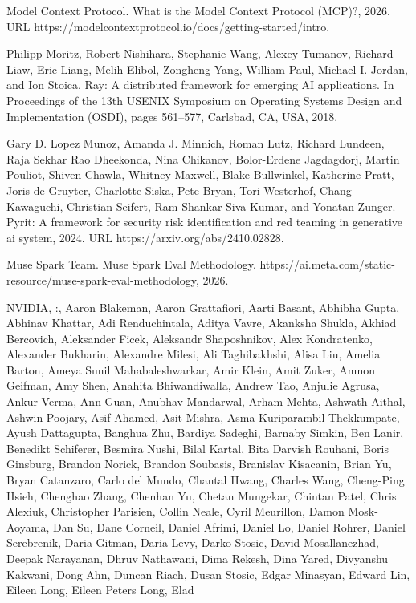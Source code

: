\documentclass[
  10
]{article}
\begin{document}
Model Context Protocol. What is the Model Context Protocol (MCP)?, 2026.
URL https://modelcontextprotocol.io/docs/getting-started/intro.

Philipp Moritz, Robert Nishihara, Stephanie Wang, Alexey Tumanov,
Richard Liaw, Eric Liang, Melih Elibol, Zongheng Yang, William Paul,
Michael I. Jordan, and Ion Stoica. Ray: A distributed framework for
emerging AI applications. In Proceedings of the 13th USENIX Symposium on
Operating Systems Design and Implementation (OSDI), pages 561--577,
Carlsbad, CA, USA, 2018.

Gary D. Lopez Munoz, Amanda J. Minnich, Roman Lutz, Richard Lundeen,
Raja Sekhar Rao Dheekonda, Nina Chikanov, Bolor-Erdene Jagdagdorj,
Martin Pouliot, Shiven Chawla, Whitney Maxwell, Blake Bullwinkel,
Katherine Pratt, Joris de Gruyter, Charlotte Siska, Pete Bryan, Tori
Westerhof, Chang Kawaguchi, Christian Seifert, Ram Shankar Siva Kumar,
and Yonatan Zunger. Pyrit: A framework for security risk identification
and red teaming in generative ai system, 2024. URL
https://arxiv.org/abs/2410.02828.

Muse Spark Team. Muse Spark Eval Methodology.
https://ai.meta.com/static-resource/muse-spark-eval-methodology, 2026.

NVIDIA, :, Aaron Blakeman, Aaron Grattafiori, Aarti Basant, Abhibha
Gupta, Abhinav Khattar, Adi Renduchintala, Aditya Vavre, Akanksha
Shukla, Akhiad Bercovich, Aleksander Ficek, Aleksandr Shaposhnikov, Alex
Kondratenko, Alexander Bukharin, Alexandre Milesi, Ali Taghibakhshi,
Alisa Liu, Amelia Barton, Ameya Sunil Mahabaleshwarkar, Amir Klein, Amit
Zuker, Amnon Geifman, Amy Shen, Anahita Bhiwandiwalla, Andrew Tao,
Anjulie Agrusa, Ankur Verma, Ann Guan, Anubhav Mandarwal, Arham Mehta,
Ashwath Aithal, Ashwin Poojary, Asif Ahamed, Asit Mishra, Asma
Kuriparambil Thekkumpate, Ayush Dattagupta, Banghua Zhu, Bardiya
Sadeghi, Barnaby Simkin, Ben Lanir, Benedikt Schiferer, Besmira Nushi,
Bilal Kartal, Bita Darvish Rouhani, Boris Ginsburg, Brandon Norick,
Brandon Soubasis, Branislav Kisacanin, Brian Yu, Bryan Catanzaro, Carlo
del Mundo, Chantal Hwang, Charles Wang, Cheng-Ping Hsieh, Chenghao
Zhang, Chenhan Yu, Chetan Mungekar, Chintan Patel, Chris Alexiuk,
Christopher Parisien, Collin Neale, Cyril Meurillon, Damon Mosk-Aoyama,
Dan Su, Dane Corneil, Daniel Afrimi, Daniel Lo, Daniel Rohrer, Daniel
Serebrenik, Daria Gitman, Daria Levy, Darko Stosic, David Mosallanezhad,
Deepak Narayanan, Dhruv Nathawani, Dima Rekesh, Dina Yared, Divyanshu
Kakwani, Dong Ahn, Duncan Riach, Dusan Stosic, Edgar Minasyan, Edward
Lin, Eileen Long, Eileen Peters Long, Elad
\end{document}

